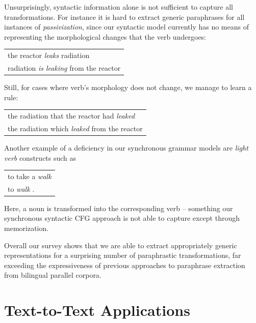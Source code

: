 \documentclass[11pt]{article}
\begin{document}
Unsurprisingly, syntactic information alone is not sufficient to
capture all transformations. For instance it is hard to extract
generic paraphrases for all instances of \emph{passivization}, since our syntactic
model currently has no means of representing the morphological changes that the
verb undergoes:
\begin{center}
\begin{tabular}{l}
  the reactor \emph{leaks} radiation \\
  radiation \emph{is leaking} from the reactor\\
\end{tabular}

\end{center}
Still, for cases where verb's morphology does not change, we manage to
learn a rule:
\begin{center}
\begin{tabular}{l}
the radiation that the reactor had \emph{leaked} \\
the radiation which \emph{leaked} from the reactor \\
\end{tabular}
\end{center}
%
Another example of a deficiency in our synchronous grammar models are
\emph{light verb} constructs such as
\begin{center}
\begin{tabular}{l}
  to take a \emph{walk} \\
  to \emph{walk} .
\end{tabular}
\end{center}
Here, a noun is transformed into the corresponding verb -- something
our synchronous syntactic CFG approach is not able to capture except
through memorization.

Overall our survey shows that we are able to extract appropriately generic
representations for a surprising number of paraphrastic
transformations, far exceeding the expressiveness of previous
approaches to paraphrase extraction from bilingual parallel corpora.


\section{Text-to-Text Applications} \label{adaptation}
\end{document}

